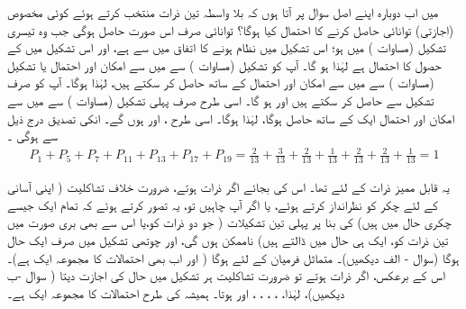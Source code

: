 میں اب دوبارہ اپنے اصل سوال پر آتا ہوں کہ بلا واسطہ تین ذرات منتخب کرتے ہوئے کوئی مخصوص  (اجازتی)  توانائی  حاصل کرنے کا احتمال  کیا ہوگا؟ توانائی  صرف اس صورت حاصل ہوگی  جب  وہ تیسری تشکیل  (مساوات  )   میں ہو؛  اس تشکیل میں نظام ہونے کا اتفاق   میں سے    ہے،  اور اس تشکیل میں  کے حصول کا احتمال  ہے  لہٰذا ہو گا۔ آپ  کو تشکیل    (مساوات  ) سے      میں سے    امکان اور  احتمال  یا تشکیل     (مساوات )  سے      میں سے   امکان اور احتمال  کے ساتھ  حاصل کر سکتے ہیں، 
 لہٰذا ہوگا۔ آپ  کو صرف  تشکیل   سے حاصل کر سکتے ہیں اور  ہو گا۔ اسی طرح  صرف پہلی تشکیل  (مساوات )  سے     میں سے  امکان اور احتمال ایک  کے ساتھ حاصل ہوگا، 
  لہٰذا ہوگا۔ اسی طرح ،
    اور
     ہوں گے۔ انکی تصدیق درج ذیل سے ہوگی ۔
\begin{align*}
	P_1 + P_5 + P_7 + P_{11} + P_{13} + P_{17} + P_{19} = \frac{2}{13} + \frac{3}{13} + \frac{2}{13} + \frac{1}{13} + \frac{2}{13} + \frac{2}{13} + \frac{1}{13} = 1
\end{align*} 

یہ قابل ممیز ذرات کے لئے تھا۔ اس کی بجائے اگر ذرات    ہوتے،   ضرورت خلاف تشاکلیت  ( اپنی آسانی کے لئے چکر کو  نظرانداز کرتے ہوئے، یا  اگر آپ چاہیں تو،  یہ تصور کرتے ہوئے کہ تمام ایک جیسے چکری حال میں ہیں) کی بنا پر پہلی تین تشکیلات (  جو دو ذرات کو،یا اس سے بھی بری  صورت میں  تین ذرات کو،   ایک ہی حال میں ڈالتے ہیں) ناممکن  ہوں گی،  اور  چوتھی تشکیل میں صرف ایک حال ہوگا (سوال - الف دیکھیں)۔ متماثل فرمیان کے لئے  ہوگا ( اور اب بھی احتمالات کا مجموعہ ایک  ہے)۔ اس کے برعکس، اگر ذرات    ہوتے تو  ضرورت تشاکلیت ہر تشکیل میں  حال کی اجازت دیتا ( سوال -ب دیکھیں)،  لہٰذا،
 ،
  ، 
  ،
  ،
    اور
     ہوتا۔ ہمیشہ کی طرح احتمالات کا مجموعہ ایک  ہے۔

